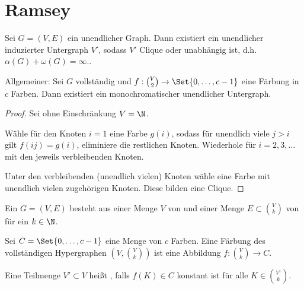 \chapter{Ramsey}



\begin{st}
    Sei $G = (V,E)$ ein unendlicher Graph.
    Dann existiert ein unendlicher induzierter Untergraph $V'$, sodass $V'$ Clique oder unabhängig ist, d.h. $\alpha(G) + \omega(G) = \infty.$.

    Allgemeiner:
    Sei $G$ vollständig und $f: \binom{V}{2} \to \Set{0, \dotsc, c - 1}$ eine Färbung in $c$ Farben.
    Dann existiert ein monochromatischer unendlicher Untergraph.
    \begin{proof}
        Sei ohne Einschränkung $V = \N$.

        Wähle für den Knoten $i = 1$ eine Farbe $g(i)$, sodass für unendlich viele $j > i$ gilt $f(ij) = g(i)$, eliminiere die restlichen Knoten.
        Wiederhole für $i = 2, 3, \dotsc$ mit den jeweils verbleibenden Knoten.

        Unter den verbleibenden (unendlich vielen) Knoten wähle eine Farbe mit unendlich vielen zugehörigen Knoten.
        Diese bilden eine Clique.
    \end{proof}
\end{st}

\begin{df}
    Ein  $G = (V, E)$ besteht aus einer Menge $V$ von  und einer Menge $E \subset \binom{V}{k}$ von  für ein $k \in \N$.

    Sei $C = \Set{0, \dotsc, c-1}$ eine Menge von $c$ Farben.
    Eine Färbung des vollständigen Hypergraphen $(V, \binom{V}{k})$ ist eine Abbildung $f: \binom{V}{k} \to C$.

    Eine Teilmenge $V' \subset V$ heißt , falls $f(K) \in C$ konstant ist für alle $K \in \binom{V'}{k}$.
\end{df}

